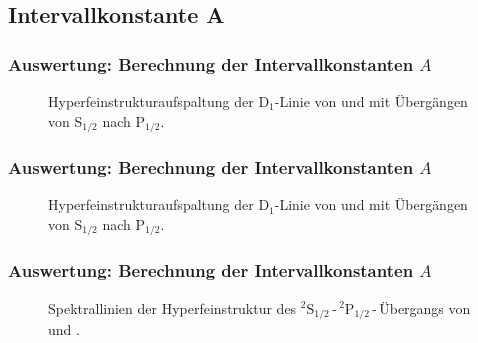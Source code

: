 \subsection{Intervallkonstante A}

\begin{frame}
\frametitle{Auswertung: Berechnung der Intervallkonstanten $A$}
\begin{figure}
    \centering
    \def\svgwidth{\textwidth}
    
    \caption{Hyperfeinstrukturaufspaltung der D$_1$-Linie von 
     und  mit Übergängen von S$_{1/2}$ nach P$_{1/2}.$}
\end{figure}
\end{frame}


\begin{frame}
\frametitle{Auswertung: Berechnung der Intervallkonstanten $A$}
\begin{figure}
    \centering
    \def\svgwidth{\textwidth}
    
    \caption{Hyperfeinstrukturaufspaltung der D$_1$-Linie von 
     und  mit Übergängen von S$_{1/2}$ nach P$_{1/2}.$}
\end{figure}
\end{frame}


\begin{frame}
\frametitle{Auswertung: Berechnung der Intervallkonstanten $A$}

\begin{figure}
    \centering
    \def\svgwidth{\textwidth}
    
    \caption{Spektrallinien der Hyperfeinstruktur des ${}^2\text{S}_{1/2}$\,-\,${}^2\text{P}_{1/2}$\,-\,Übergangs
    von  und .}
\end{figure}

\end{frame}


